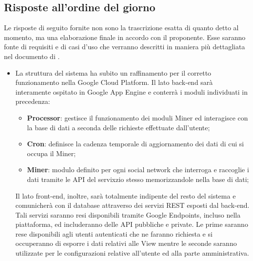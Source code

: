 \subsection{Risposte all'ordine del giorno}
Le risposte di seguito fornite non sono la trascrizione esatta di quanto detto al momento, ma una elaborazione
finale in accordo con il proponente. \newline
Esse saranno fonte di requisiti e di casi d'uso che verranno descritti in maniera più dettagliata nel documento di \docNameVersionAdR.
\begin{itemize}
  \item La struttura del sistema ha subito un raffinamento per il corretto funzionamento nella Google Cloud Platform.
  Il lato back-end sarà interamente ospitato in Google App Engine e conterrà i moduli individuati in precedenza:
  \begin{itemize}
    \item \textbf{Processor}: gestisce il funzionamento dei moduli Miner ed interagisce con la base di dati a seconda
    delle richieste effettuate dall'utente;
    \item \textbf{Cron}: definisce la cadenza temporale di aggiornamento dei dati di cui si occupa il Miner;
    \item \textbf{Miner}: modulo definito per ogni social network che interroga e raccoglie i dati tramite le
    API del servixzio stesso memorizzandole nella base di dati;
  \end{itemize}
  Il lato front-end, inoltre, sarà totalmente indipente del resto del sistema e comunicherà con il database attraverso
  dei servizi REST esposti dal back-end. Tali servizi saranno resi disponibili tramite Google Endpoints, incluso nella
  piattaforma, ed includeranno delle API pubbliche e private. Le prime saranno rese disponibili agli utenti autenticati che
  ne faranno richiesta e si occuperanno di esporre i dati relativi alle View mentre le seconde saranno utilizzate per
  le configurazioni relative all'utente ed alla parte amministrativa.


\end{itemize}
